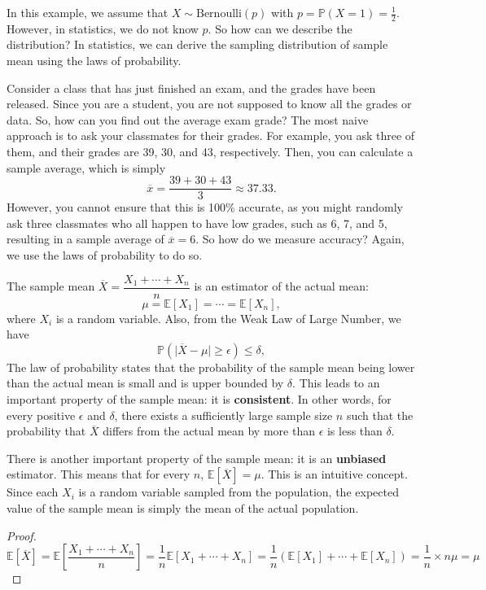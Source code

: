 In this example, we assume that \(X \sim \text{Bernoulli}(p)\) with \(p = \mathbb{P}(X = 1) = \frac{1}{2}\). However, in statistics, we do not know \(p\). So how can we describe the distribution? In statistics, we can derive the sampling distribution of sample mean using the laws of probability. 

Consider a class that has just finished an exam, and the grades have been released. Since you are a student, you are not supposed to know all the grades or data. So, how can you find out the average exam grade? The most naive approach is to ask your classmates for their grades. For example, you ask three of them, and their grades are 39, 30, and 43, respectively. Then, you can calculate a sample average, which is simply
\[
  \overline{x} = \dfrac{39 + 30 + 43}{3} \approx 37.33. 
\]
However, you cannot ensure that this is 100\% accurate, as you might randomly ask three classmates who all happen to have low grades, such as 6, 7, and 5, resulting in a sample average of \(\overline{x} = 6\). So how do we measure accuracy? Again, we use the laws of probability to do so.

The sample mean \(\overline{X} = \dfrac{X_1 + \cdots + X_n}{n}\) is an estimator of the actual mean: 
\[
  \mu = \mathbb{E}[X_1] = \cdots = \mathbb{E}[X_n],
\]
where \(X_i\) is a random variable. Also, from the Weak Law of Large Number, we have 
\[
  \mathbb{P}(\vert \overline{X} - \mu \vert  \geq \epsilon ) \leq \delta, 
\]
The law of probability states that the probability of the sample mean being lower than the actual mean is small and is upper bounded by \(\delta\). This leads to an important property of the sample mean: it is \textbf{consistent}. In other words, for every positive \(\epsilon\) and \(\delta\), there exists a sufficiently large sample size \(n\) such that the probability that \(\overline{X}\) differs from the actual mean by more than \(\epsilon\) is less than \(\delta\).

There is another important property of the sample mean: it is an \textbf{unbiased} estimator. This means that for every \(n\), \(\mathbb{E}[\overline{X}] = \mu\). This is an intuitive concept. Since each \(X_i\) is a random variable sampled from the population, the expected value of the sample mean is simply the mean of the actual population.

\begin{proof}
  \[
    \mathbb{E}[\overline{X}] = \mathbb{E}\left[\dfrac{X_1 + \cdots + X_n}{n}\right] = \dfrac{1}{n} \mathbb{E}[X_1 + \cdots + X_n] = \dfrac{1}{n} (\mathbb{E}[X_1] + \cdots + \mathbb{E}[X_n]) = \dfrac{1}{n} \times n\mu = \mu
  \]
\end{proof}


